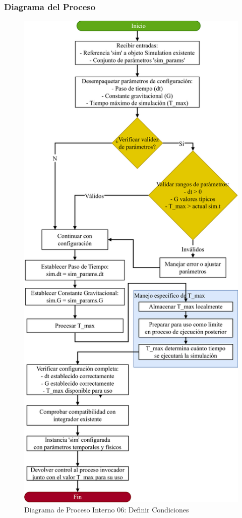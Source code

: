 \subsubsection{Diagrama del Proceso}
\begin{figure}[H]
    \centering
    \includegraphics[width=\textwidth]{img/Analisis/DiagramaProcesos/DiagramaProceso06_DefinirCondiciones.png}
    \caption{Diagrama de Proceso Interno 06: Definir Condiciones}%
    \label{fig:process_diagram06}
\end{figure}